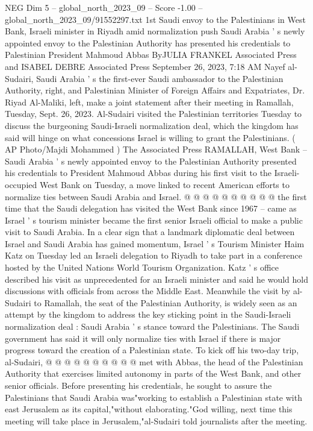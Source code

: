 \begin{textsample}{NEG Dim 5 – global\_north\_2023\_09 – Score -1.00 – global\_north\_2023\_09/91552297.txt}  \label{ex:f5_neg_008}
1st Saudi envoy to the Palestinians in West Bank, Israeli minister in Riyadh amid normalization push Saudi Arabia ' s newly appointed envoy to the Palestinian Authority has presented his credentials to Palestinian President Mahmoud Abbas ByJULIA FRANKEL Associated Press and ISABEL DEBRE Associated Press September 26, 2023, 7:18 AM Nayef al-Sudairi, Saudi Arabia ' s the first-ever Saudi ambassador to the Palestinian Authority, right, and Palestinian Minister of Foreign Affairs and Expatriates, Dr.
Riyad Al-Maliki, left, make a joint statement after their meeting in Ramallah, Tuesday, Sept. 26, 2023.
Al-Sudairi visited the Palestinian territories Tuesday to discuss the burgeoning Saudi-Israeli normalization deal, which the kingdom has said will hinge on what concessions Israel is willing to grant the Palestinians. ( AP Photo/Majdi Mohammed ) The Associated Press RAMALLAH, West Bank -- Saudi Arabia ' s newly appointed envoy to the Palestinian Authority presented his credentials to President Mahmoud Abbas during his first visit to the Israeli-occupied West Bank on Tuesday, a move linked to recent American efforts to normalize ties between Saudi Arabia and Israel. @ @ @ @ @ @ @ @ @ @ the first time that the Saudi delegation has visited the West Bank since 1967 -- came as Israel ' s tourism minister became the first senior Israeli official to make a public visit to Saudi Arabia.
In a clear sign that a landmark diplomatic deal between Israel and Saudi Arabia has gained momentum, Israel ' s Tourism Minister Haim Katz on Tuesday led an Israeli delegation to Riyadh to take part in a conference hosted by the United Nations World Tourism Organization.
Katz ' s office described his visit as unprecedented for an Israeli minister and said he would hold discussions with officials from across the Middle East.
Meanwhile the visit by al-Sudairi to Ramallah, the seat of the Palestinian Authority, is widely seen as an attempt by the kingdom to address the key sticking point in the Saudi-Israeli normalization deal : Saudi Arabia ' s stance toward the Palestinians.
The Saudi government has said it will only normalize ties with Israel if there is major progress toward the creation of a Palestinian state.
To kick off his two-day trip, al-Sudairi, @ @ @ @ @ @ @ @ @ @ met with Abbas, the head of the Palestinian Authority that exercises limited autonomy in parts of the West Bank, and other senior officials.
Before presenting his credentials, he sought to assure the Palestinians that Saudi Arabia was"working to establish a Palestinian state with east Jerusalem as its capital,"without elaborating."God willing, next time this meeting will take place in Jerusalem,"al-Sudairi told journalists after the meeting.

\end{textsample}

